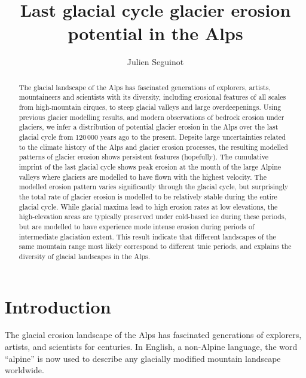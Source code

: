 \documentclass[utf8]{article}
\title{Last glacial cycle glacier erosion potential in the Alps}
\author{Julien Seguinot}
\affil{Anafi, Greece}
\begin{document}

\maketitle

\begin{abstract}

    The glacial landscape of the Alps has fascinated generations of explorers,
    artists, mountaineers and scientists with its diversity, including
    erosional features of all scales from high-mountain cirques, to steep
    glacial valleys and large overdeepenings. Using previous glacier modelling
    results, and modern observations of bedrock erosion under glaciers, we
    infer a distribution of potential glacier erosion in the Alps over the last
    glacial cycle from 120\,000 years ago to the present.
    Depsite large uncertainties related to the climate history of the Alps and
    glacier erosion processes, the resulting modelled patterns of glacier
    erosion shows persistent features (hopefully). The cumulative imprint of
    the last glacial cycle shows peak erosion at the mouth of the large Alpine
    valleys where glaciers are modelled to have flown with the highest
    velocity. The modelled erosion pattern varies significantly through the
    glacial cycle, but surprisingly the total rate of glacier erosion is
    modelled to be relatively stable during the entire glacial cycle.  While
    glacial maxima lead to high erosion rates at low elevations, the
    high-elevation areas are typically preserved under cold-based ice during
    these periods, but are modelled to have experience mode intense erosion
    during periods of intermediate glaciation extent.
    This result indicate that different landscapes of the same mountain range
    most likely correspond to different tmie periods, and explains the
    diversity of glacial landscapes in the Alps.

\end{abstract}

\section{Introduction}

    The glacial erosion landscape of the Alps has fascinated generations of
    explorers, artists, and scientists for centuries. In English, a non-Alpine
    language, the word “alpine” is now used to describe any glacially modified
    mountain landscape worldwide.
\end{document}
